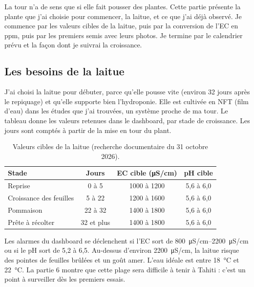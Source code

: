 \clearpage
{}

La tour n'a de sens que si elle fait pousser des plantes. Cette partie présente la plante que j'ai choisie pour commencer, la laitue, et ce que j'ai déjà observé. Je commence par les valeurs cibles de la laitue, puis par la conversion de l'EC en ppm, puis par les premiers semis avec leurs photos. Je termine par le calendrier prévu et la façon dont je suivrai la croissance.

\subsection{Les besoins de la laitue}

J'ai choisi la laitue pour débuter, parce qu'elle pousse vite (environ 32 jours après le repiquage) et qu'elle supporte bien l'hydroponie. Elle est cultivée en NFT (film d'eau) dans les études que j'ai trouvées, un système proche de ma tour. Le tableau donne les valeurs retenues dans le dashboard, par stade de croissance. Les jours sont comptés à partir de la mise en tour du plant.

\begin{table}[H]
\centering
\small
\begin{tabular}{|l|c|c|c|}
\hline
\textbf{Stade} & \textbf{Jours} & \textbf{EC cible (\unit{\micro S/cm})} & \textbf{pH cible} \\
\hline
Reprise & 0 à 5 & 1000 à 1200 & 5,6 à 6,0 \\
\hline
Croissance des feuilles & 5 à 22 & 1200 à 1600 & 5,6 à 6,0 \\
\hline
Pommaison & 22 à 32 & 1400 à 1800 & 5,6 à 6,0 \\
\hline
Prête à récolter & 32 et plus & 1400 à 1800 & 5,6 à 6,0 \\
\hline
\end{tabular}
\caption{Valeurs cibles de la laitue (recherche documentaire du 31 octobre 2026).}
\end{table}

Les alarmes du dashboard se déclenchent si l'EC sort de \qtyrange{800}{2200}{\micro S/cm} ou si le pH sort de 5,2 à 6,5. Au-dessus d'environ \qty{2200}{\micro S/cm}, la laitue risque des pointes de feuilles brûlées et un goût amer. L'eau idéale est entre \qty{18}{\celsius} et \qty{22}{\celsius}. La partie 6 montre que cette plage sera difficile à tenir à Tahiti : c'est un point à surveiller dès les premiers essais.

